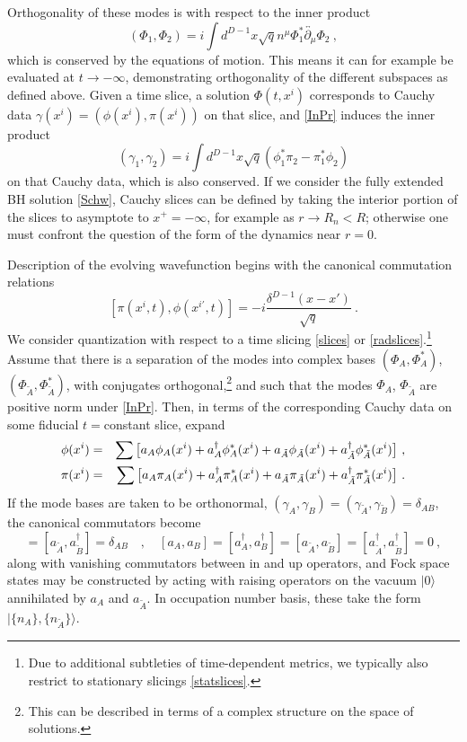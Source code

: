 \documentclass[11pt]{article}
\numberwithin{equation}{section}
\newcommand{\beq}{\begin{equation}}
\newcommand{\eeq}{\end{equation}}
\newcommand{\bea}{\begin{eqnarray}}
\newcommand{\eea}{\end{eqnarray}}
\newcommand{\tA}{{\tilde A}}
\newcommand{\tB}{{\tilde B}}
\begin{document}
Orthogonality of these modes is with respect to the inner product
\beq\label{InPr}
(\Phi_1,\Phi_2) = i \int d^{D-1} x \sqrt{q} n^\mu \Phi_1^*\overleftrightarrow{\partial_\mu} \Phi_2\ ,
\eeq
which is conserved by the equations of motion.  This means it can for example be evaluated at $t\rightarrow-\infty$, demonstrating orthogonality of the different subspaces as defined above.  Given a time slice, a solution $\Phi(t,x^i)$ corresponds to Cauchy data $\gamma(x^i)=(\phi(x^i),\pi(x^i))$ on that slice, and \eqref{InPr} induces the inner product
\beq\label{CauPr}
(\gamma_1,\gamma_2)= i\int d^{D-1}x \sqrt{q}(\phi_1^*\pi_2-\pi_1^*\phi_2)
\eeq
on that Cauchy data, which is also conserved.  If we consider the fully extended BH solution \eqref{Schw}, Cauchy slices can be defined by taking the interior portion of the slices to asymptote to $x^+=-\infty$, for example as $r\rightarrow R_n<R$; otherwise one must confront the question of the form of the dynamics near $r=0$.

Description of the evolving wavefunction begins with the canonical commutation relations 
\beq\label{CCR}
[\pi(x^i, t), \phi(x^{i\prime}, t)]=-i \frac{\delta^{D-1}(x-x')}{\sqrt{q}}\ .
\eeq
We consider quantization with respect to a time slicing \eqref{slices} or \eqref{radslices}.\footnote{Due to additional subtleties of time-dependent metrics\cite{ToVa,CMOV,CFMM,AgAs,MuOe}, we typically also restrict to stationary slicings \eqref{statslices}.}  Assume that there is a separation of the modes into complex bases $(\Phi_A,\Phi^*_A)$, $(\Phi_{\tilde A},\Phi^*_{\tilde A})$, with conjugates orthogonal,\footnote{This can be described in terms of a complex structure on the space of solutions.} and such that the modes $\Phi_A$, $\Phi_{\tilde A}$ are positive norm under \eqref{InPr}.  Then, in terms of the corresponding Cauchy data on some fiducial $t=$constant slice, expand
\bea\label{piphiexps}
\phi(x^i) &=& \sum \big[a_A \phi_A(x^i)+a_A^{\dagger} \phi_A^*(x^i)+ a_\tA \phi_\tA(x^i)+a_\tA^{\dagger} \phi_\tA^*(x^i)\big]\  ,\cr
\pi(x^i) &=& \sum \big[a_A\pi_A(x^i)+a_A^{\dagger} \pi_A^*(x^i)+a_\tA\pi_\tA(x^i)+a_\tA^{\dagger} \pi_\tA^*(x^i)\big]\ .
\eea
If the mode bases are taken to be orthonormal, $(\gamma_A,\gamma_B)=(\gamma_\tA,\gamma_\tB)=\delta_{AB}$, the canonical commutators become
\beq
[a_A, a_B^{\dagger}] = [a_\tA, a_\tB^{\dagger}] =\delta_{AB}\quad ,\quad  [a_A, a_B]=[a_A^{\dagger}, a_B^{\dagger}] = [a_\tA, a_\tB]=[a_\tA^{\dagger}, a_\tB^{\dagger}] =0\ ,
\eeq
along with vanishing commutators between in and up operators, 
and Fock space states may be constructed by acting with raising operators on the vacuum $|0\rangle$ annihilated by $a_A$ and $a_\tA$.  In occupation number basis, these take the form $|\{n_A\},\{n_\tA\}\rangle$.
\end{document}
